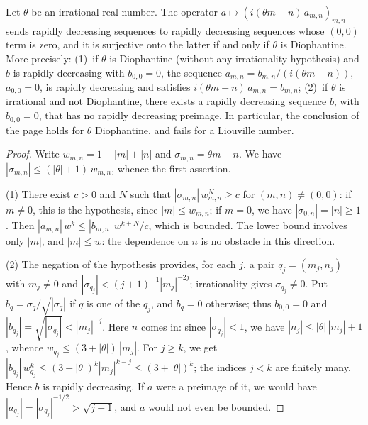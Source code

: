 \begin{encadre}
\begin{theoreme}\label{thm:quillen-1983-4}
Let $\theta$ be an irrational real number. The operator $a \mapsto (i(\theta m - n)\,a_{m,n})_{m,n}$ sends rapidly decreasing sequences to rapidly decreasing sequences whose $(0,0)$ term is zero, and it is surjective onto the latter if and only if $\theta$ is Diophantine. More precisely: (1)~if $\theta$ is Diophantine (without any irrationality hypothesis) and $b$ is rapidly decreasing with $b_{0,0} = 0$, the sequence $a_{m,n} = b_{m,n}/(i(\theta m - n))$, $a_{0,0} = 0$, is rapidly decreasing and satisfies $i(\theta m - n)\,a_{m,n} = b_{m,n}$; (2)~if $\theta$ is irrational and not Diophantine, there exists a rapidly decreasing sequence $b$, with $b_{0,0} = 0$, that has no rapidly decreasing preimage.
In particular, the conclusion of the page holds for $\theta$ Diophantine, and fails for a Liouville number.
\end{theoreme}
\end{encadre}

\begin{proof}
Write $w_{m,n} = 1 + |m| + |n|$ and $\sigma_{m,n} = \theta m - n$. We have $|\sigma_{m,n}| \le (|\theta| + 1)\,w_{m,n}$, whence the first assertion.

(1) There exist $c > 0$ and $N$ such that $|\sigma_{m,n}|\,w_{m,n}^N \ge c$ for $(m, n) \ne (0,0)$: if $m \ne 0$, this is the hypothesis, since $|m| \le w_{m,n}$; if $m = 0$, we have $|\sigma_{0,n}| = |n| \ge 1$. Then $|a_{m,n}|\,w^k \le |b_{m,n}|\,w^{k+N}/c$, which is bounded. The lower bound involves only $|m|$, and $|m| \le w$: the dependence on $n$ is no obstacle in this direction.

(2) The negation of the hypothesis provides, for each $j$, a pair $q_j = (m_j, n_j)$ with $m_j \ne 0$ and $|\sigma_{q_j}| < (j+1)^{-1}|m_j|^{-2j}$; irrationality gives $\sigma_{q_j} \ne 0$. Put $b_{q} = \sigma_q / \sqrt{|\sigma_q|}$ if $q$ is one of the $q_j$, and $b_q = 0$ otherwise; thus $b_{0,0} = 0$ and $|b_{q_j}| = \sqrt{|\sigma_{q_j}|} < |m_j|^{-j}$. Here $n$ comes in: since $|\sigma_{q_j}| < 1$, we have $|n_j| \le |\theta|\,|m_j| + 1$, whence $w_{q_j} \le (3 + |\theta|)\,|m_j|$. For $j \ge k$, we get $|b_{q_j}|\,w_{q_j}^k \le (3 + |\theta|)^k |m_j|^{k-j} \le (3 + |\theta|)^k$; the indices $j < k$ are finitely many. Hence $b$ is rapidly decreasing. If $a$ were a preimage of it, we would have $|a_{q_j}| = |\sigma_{q_j}|^{-1/2} > \sqrt{j+1}$, and $a$ would not even be bounded.
\end{proof}

